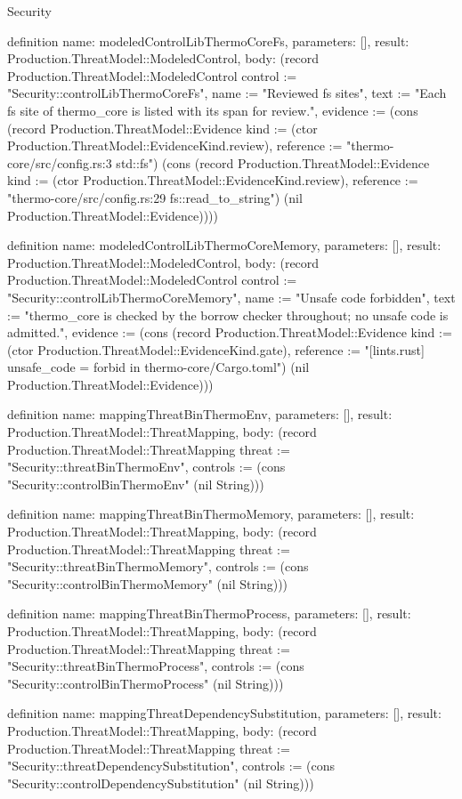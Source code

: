 \begin{lexlean}{Security}
\begin{semanticmodule}
definition{
  name: modeledControlLibThermoCoreFs,
  parameters: [],
  result: Production.ThreatModel::ModeledControl,
  body: (record Production.ThreatModel::ModeledControl {control := "Security::controlLibThermoCoreFs", name := "Reviewed fs sites", text := "Each fs site of thermo_core is listed with its span for review.", evidence := (cons (record Production.ThreatModel::Evidence {kind := (ctor Production.ThreatModel::EvidenceKind.review), reference := "thermo-core/src/config.rs:3 std::fs"}) (cons (record Production.ThreatModel::Evidence {kind := (ctor Production.ThreatModel::EvidenceKind.review), reference := "thermo-core/src/config.rs:29 fs::read_to_string"}) (nil Production.ThreatModel::Evidence)))})
}

definition{
  name: modeledControlLibThermoCoreMemory,
  parameters: [],
  result: Production.ThreatModel::ModeledControl,
  body: (record Production.ThreatModel::ModeledControl {control := "Security::controlLibThermoCoreMemory", name := "Unsafe code forbidden", text := "thermo_core is checked by the borrow checker throughout; no unsafe code is admitted.", evidence := (cons (record Production.ThreatModel::Evidence {kind := (ctor Production.ThreatModel::EvidenceKind.gate), reference := "[lints.rust] unsafe_code = forbid in thermo-core/Cargo.toml"}) (nil Production.ThreatModel::Evidence))})
}

definition{
  name: mappingThreatBinThermoEnv,
  parameters: [],
  result: Production.ThreatModel::ThreatMapping,
  body: (record Production.ThreatModel::ThreatMapping {threat := "Security::threatBinThermoEnv", controls := (cons "Security::controlBinThermoEnv" (nil String))})
}

definition{
  name: mappingThreatBinThermoMemory,
  parameters: [],
  result: Production.ThreatModel::ThreatMapping,
  body: (record Production.ThreatModel::ThreatMapping {threat := "Security::threatBinThermoMemory", controls := (cons "Security::controlBinThermoMemory" (nil String))})
}

definition{
  name: mappingThreatBinThermoProcess,
  parameters: [],
  result: Production.ThreatModel::ThreatMapping,
  body: (record Production.ThreatModel::ThreatMapping {threat := "Security::threatBinThermoProcess", controls := (cons "Security::controlBinThermoProcess" (nil String))})
}

definition{
  name: mappingThreatDependencySubstitution,
  parameters: [],
  result: Production.ThreatModel::ThreatMapping,
  body: (record Production.ThreatModel::ThreatMapping {threat := "Security::threatDependencySubstitution", controls := (cons "Security::controlDependencySubstitution" (nil String))})
}


\end{semanticmodule}
\end{lexlean}
